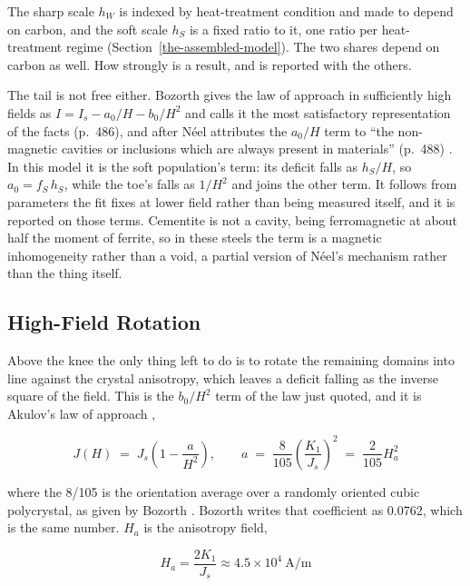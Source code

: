 \documentclass[
  11pt,
]{article}
\begin{document}
The sharp scale \(h_W\) is indexed by heat-treatment condition and made to depend on carbon, and the soft scale \(h_S\) is a fixed ratio to it, one ratio per heat-treatment regime (Section~\ref{the-assembled-model}). The two shares depend on carbon as well. How strongly is a result, and is reported with the others.

The tail is not free either. Bozorth gives the law of approach in sufficiently high fields as \(I = I_s - a_0/H - b_0/H^{2}\) and calls it the most satisfactory representation of the facts (p.~486), and after Néel attributes the \(a_0/H\) term to ``the non-magnetic cavities or inclusions which are always present in materials'' (p.~488) \cite{bozorth1951}. In this model it is the soft population's term: its deficit falls as \(h_S/H\), so \(a_0 = f_S\,h_S\), while the toe's falls as \(1/H^{2}\) and joins the other term. It follows from parameters the fit fixes at lower field rather than being measured itself, and it is reported on those terms. Cementite is not a cavity, being ferromagnetic at about half the moment of ferrite, so in these steels the term is a magnetic inhomogeneity rather than a void, a partial version of Néel's mechanism rather than the thing itself.

\subsection{High-Field Rotation}\label{high-field-rotation}

Above the knee the only thing left to do is to rotate the remaining domains into line against the crystal anisotropy, which leaves a deficit falling as the inverse square of the field. This is the \(b_0/H^{2}\) term of the law just quoted, and it is Akulov's law of approach \cite{akulov1931},

\begin{equation}\label{eq:akulov}
J(H) \;=\; J_s\left(1-\frac{a}{H^{2}}\right), \qquad a \;=\; \frac{8}{105}\left(\frac{K_1}{J_s}\right)^{\!2} \;=\; \frac{2}{105}H_a^{2}
\end{equation}

where the 8/105 is the orientation average over a randomly oriented cubic polycrystal, as given by Bozorth \cite{bozorth1951}. Bozorth writes that coefficient as 0.0762, which is the same number. \(H_a\) is the anisotropy field,

\begin{equation}\label{eq:ha}
H_a = \frac{2K_1}{J_s} \approx 4.5\times10^{4}\ \mathrm{A/m}
\end{equation}
\end{document}
